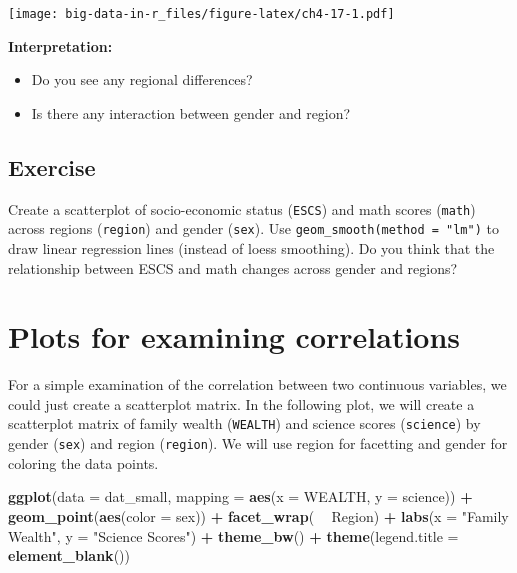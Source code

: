 \documentclass[]{book}
\newenvironment{Shaded}{\begin{snugshade}}{\end{snugshade}}
\newcommand{\DataTypeTok}[1]{\textcolor[rgb]{0.13,0.29,0.53}{#1}}
\newcommand{\KeywordTok}[1]{\textcolor[rgb]{0.13,0.29,0.53}{\textbf{#1}}}
\newcommand{\NormalTok}[1]{#1}
\newcommand{\OperatorTok}[1]{\textcolor[rgb]{0.81,0.36,0.00}{\textbf{#1}}}
\newcommand{\StringTok}[1]{\textcolor[rgb]{0.31,0.60,0.02}{#1}}
\providecommand{\tightlist}{%
  \setlength{\itemsep}{0pt}\setlength{\parskip}{0pt}}
\begin{document}
\texttt{[image: big-data-in-r\_files/figure-latex/ch4-17-1.pdf]}

\textbf{Interpretation:}

\begin{itemize}
\tightlist
\item
  Do you see any regional differences?
\item
  Is there any interaction between gender and region?
\end{itemize}

\hypertarget{exercise-1}{%
\subsection{Exercise}\label{exercise-1}}

Create a scatterplot of socio-economic status (\texttt{ESCS}) and math scores (\texttt{math}) across regions (\texttt{region}) and gender (\texttt{sex}). Use \texttt{geom\_smooth(method\ =\ "lm")} to draw linear regression lines (instead of loess smoothing). Do you think that the relationship between ESCS and math changes across gender and regions?

\hypertarget{plots-for-examining-correlations}{%
\section{Plots for examining correlations}\label{plots-for-examining-correlations}}

For a simple examination of the correlation between two continuous variables, we could just create a scatterplot matrix. In the following plot, we will create a scatterplot matrix of family wealth (\texttt{WEALTH}) and science scores (\texttt{science}) by gender (\texttt{sex}) and region (\texttt{region}). We will use region for facetting and gender for coloring the data points.

\begin{Shaded}
\begin{Highlighting}[]
\KeywordTok{ggplot}\NormalTok{(}\DataTypeTok{data =}\NormalTok{ dat_small,}
       \DataTypeTok{mapping =} \KeywordTok{aes}\NormalTok{(}\DataTypeTok{x =}\NormalTok{ WEALTH, }\DataTypeTok{y =}\NormalTok{ science)) }\OperatorTok{+}
\StringTok{  }\KeywordTok{geom_point}\NormalTok{(}\KeywordTok{aes}\NormalTok{(}\DataTypeTok{color =}\NormalTok{ sex)) }\OperatorTok{+}
\StringTok{  }\KeywordTok{facet_wrap}\NormalTok{( }\OperatorTok{~}\StringTok{ }\NormalTok{Region) }\OperatorTok{+}
\StringTok{  }\KeywordTok{labs}\NormalTok{(}\DataTypeTok{x =} \StringTok{"Family Wealth"}\NormalTok{, }\DataTypeTok{y =} \StringTok{"Science Scores"}\NormalTok{) }\OperatorTok{+}
\StringTok{  }\KeywordTok{theme_bw}\NormalTok{() }\OperatorTok{+}
\StringTok{  }\KeywordTok{theme}\NormalTok{(}\DataTypeTok{legend.title =} \KeywordTok{element_blank}\NormalTok{())}
\end{Highlighting}
\end{Shaded}
\end{document}
